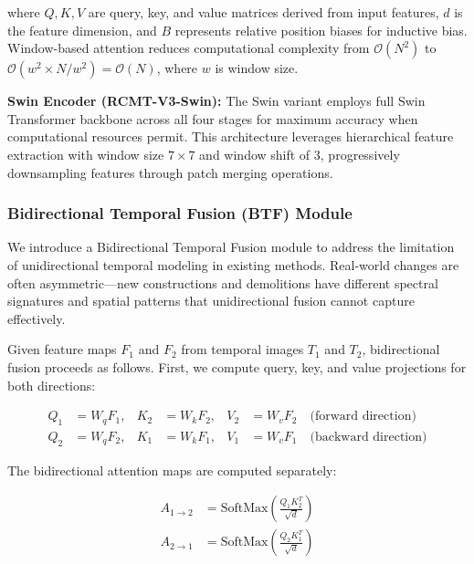 \documentclass[journal]{IEEEtran}
\begin{document}
{where $Q, K, V$ are query, key, and value matrices derived from input features, $d$ is the feature dimension, and $B$ represents relative position biases for inductive bias. Window-based attention reduces computational complexity from $\mathcal{O}(N^2)$ to $\mathcal{O}(w^2 \times N/w^2) = \mathcal{O}(N)$, where $w$ is window size.

\textbf{Swin Encoder (RCMT-V3-Swin):} The Swin variant employs full Swin Transformer backbone across all four stages for maximum accuracy when computational resources permit. This architecture leverages hierarchical feature extraction with window size $7 \times 7$ and window shift of 3, progressively downsampling features through patch merging operations.

\subsubsection{Bidirectional Temporal Fusion (BTF) Module}

We introduce a Bidirectional Temporal Fusion module to address the limitation of unidirectional temporal modeling in existing methods. Real-world changes are often asymmetric—new constructions and demolitions have different spectral signatures and spatial patterns that unidirectional fusion cannot capture effectively.

Given feature maps $F_1$ and $F_2$ from temporal images $T_1$ and $T_2$, bidirectional fusion proceeds as follows. First, we compute query, key, and value projections for both directions:

\begin{equation}
\begin{aligned}
Q_1 &= W_q F_1, & K_2 &= W_k F_2, & V_2 &= W_v F_2 \quad \text{(forward direction)} \\
Q_2 &= W_q F_2, & K_1 &= W_k F_1, & V_1 &= W_v F_1 \quad \text{(backward direction)}
\end{aligned}
\label{eq:qkv}
\end{equation}

The bidirectional attention maps are computed separately:

\begin{equation}
\begin{aligned}
A_{1 \rightarrow 2} &= \text{SoftMax}\left(\frac{Q_1 K_2^T}{\sqrt{d}}\right) \\
A_{2 \rightarrow 1} &= \text{SoftMax}\left(\frac{Q_2 K_1^T}{\sqrt{d}}\right)
\end{aligned}
\label{eq:btf}
\end{equation}

}
\end{document}

